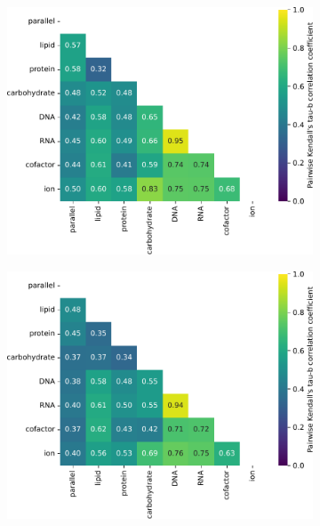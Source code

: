 \begin{figure}
  \centering
  \begin{subfigure}[t]{0.45\textwidth}
  \centering
    \includegraphics[width=\linewidth]{CompareEnzUse_glc00p00_pyr08p89_ammUnres_2.pdf}
    \caption{
    }
    \label{fig:model-rank-pyr-lowratio-kendall}
  \end{subfigure}%
  \begin{subfigure}[t]{0.45\textwidth}
  \centering
    \includegraphics[width=\linewidth]{CompareEnzUse_glc00p00_pyr03p73_amm00p90_2.pdf}
    \caption{
    }
    \label{fig:model-rank-pyr-highratio-kendall}
  \end{subfigure}


\end{figure}
